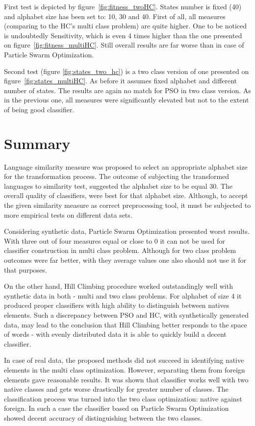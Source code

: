 \documentclass{mini}
\begin{document}
First test is depicted by figure~\ref{fig:fitness_twoHC}. States number is fixed (40) and alphabet size has been set to: 10, 30 and 40. First of all, all measures (comparing to the HC's multi class problem) are quite higher. One to be noticed is undoubtedly Sensitivity, which is even 4 times higher than the one presented on figure~\ref{fig:fitness_multiHC}. Still overall results are far worse than in case of Particle Swarm Optimization.

\makeFigureIndistinctHC

Second test (figure \ref{fig:states_two_hc}) is a two class version of one presented on figure~\ref{fig:states_multiHC}. As before it assumes fixed alphabet and different number of states. The results are again no match for PSO in two class version. As in the previous one, all measures were significantly elevated but not to the extent of being good classifier.
\makeFigureStatesTwoHC

\section{Summary}

Language similarity measure was proposed to select an appropriate alphabet size for the transformation process. The outcome of subjecting the transformed languages to similarity test, suggested the alphabet size to be equal $30$. The overall quality of classifiers, were best for that alphabet size. Although, to accept the given similarity measure as correct preprocessing tool, it must be subjected to more empirical tests on different data sets.

Considering synthetic data, Particle Swarm Optimization presented worst results. With three out of four measures equal or close to 0 it can not be used for classifier construction in multi class problem. Although for two class problem outcomes were far better, with they average values one also should not use it for that purposes.

On the other hand, Hill Climbing procedure worked outstandingly well with synthetic data in both - multi and two class problems. For alphabet of size 4 it produced proper classifiers with high ability to distinguish between natives elements. Such a discrepancy between PSO and HC, with synthetically generated data, may lead to the conclusion that Hill Climbing better responds to the space of words - with evenly distributed data it is able to quickly build a decent classifier.

In case of real data, the proposed methods did not succeed in identifying native elements in the multi class optimization. However, separating them from foreign elements gave reasonable results. It was shown that classifier works well with two native classes and gets worse drastically for greater number of classes. The classification process was turned into the two class optimization: native against foreign. In such a case the classifier based on Particle Swarm Optimization showed decent accuracy of distinguishing between the two classes.
\end{document}
